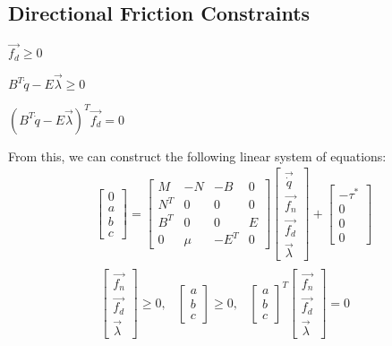 \subsection{Directional Friction Constraints}
\begin{packed_item}
\item $\vec{f_d} \geq 0$
\item $B^T\dot{q} - E\vec{\lambda} \geq 0$
\item $(B^T\dot{q} - E\vec{\lambda})^T\vec{f_d} = 0$
\end{packed_item}
From this, we can construct the following linear system of equations:
\begin{equation}
\label{eq:bigsystem}
\begin{array}{cc}
\left[\begin{matrix}0 \\ a \\ b \\ c \end{matrix}\right] = \left[\begin{matrix}M & -N & -B & 0 \\ N^T & 0 & 0 & 0 \\ B^T & 0 & 0 & E \\ 0 & \mu & -E^T & 0\end{matrix}\right]\left[\begin{matrix}\vec{\dot{q}} \\ \vec{f_n} \\ \vec{f_d} \\ \vec{\lambda}\end{matrix}\right] + \left[\begin{matrix}-\tau^* \\ 0 \\ 0 \\0\end{matrix}\right] \\
\begin{matrix}
\left[\begin{matrix}\vec{f_n} \\ \vec{f_d} \\ \vec{\lambda}\end{matrix}\right] \geq 0, & 
\left[\begin{matrix}a \\ b \\ c\end{matrix}\right] \geq 0, &
\left[\begin{matrix}a \\ b \\ c\end{matrix}\right]^T\left[\begin{matrix}\vec{f_n} \\ \vec{f_d} \\ \vec{\lambda}\end{matrix}\right] = 0
\end{matrix}
\end{array}
\end{equation}
